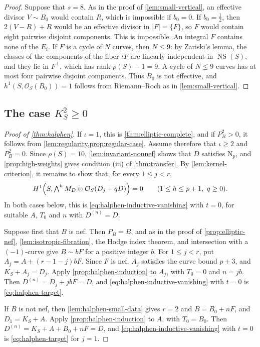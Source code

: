 \documentclass[11pt,reqno]{amsart}
\numberwithin{equation}{section}
\theoremstyle{remark}
\newcommand{\sshf}[1]{\mathcal{O}_{#1}}
\newcommand{\NP}{\mathrm N}
\begin{document}
\begin{proof}
Suppose that \(s=8\). As in the proof of \cref{lem:small-vertical}, an effective divisor \(V\sim B_0\) would contain \(R\), which is impossible if \(b_0=0\). If \(b_0=\tfrac12\), then \(2(V-R)+R\) would be an effective divisor in \(|F|=\{F\}\), so \(F\) would contain eight pairwise disjoint components. This is impossible. An integral \(F\) contains none of the \(E_i\). If \(F\) is a cycle of \(N\) curves, then \(N\leq9\): by Zariski's lemma, the classes of the components of the fiber \(\iota F\) are linearly independent in \(\operatorname{NS}(S)\), and they lie in \(F^\perp\), which has rank \(\rho(S)-1=9\). A cycle of \(N\leq9\) curves has at most four pairwise disjoint components. Thus \(B_0\) is not effective, and \(h^1(S,\sshf{S}(B_0))=1\) follows from Riemann--Roch as in \cref{lem:small-vertical}.
\end{proof}

\subsection{The case \texorpdfstring{\(K_S^2\geq0\)}{K\_S\^2 >= 0}}

\begin{proof}[Proof of \cref{thm:halphen}]
If \(\iota=1\), this is \cref{thm:elliptic-complete}, and if \(P_B^2>0\), it follows from \cref{lem:regularity,prop:regular-case}. Assume therefore that \(\iota\geq2\) and \(P_B^2=0\). Since \(\rho(S)=10\), \cref{lem:invariant-nonnef} shows that \(D\) satisfies \(\NP_p\), and \cref{prop:high-weights} gives condition \textup{(iii)} of \cref{thm:transfer}. By \cref{lem:kernel-criterion}, it remains to show that, for every \(1\leq j<r\),
\begin{equation}\label{eq:halphen-target}
 H^1\Bigl(S,\textstyle\bigwedge^hM_D\otimes\sshf{S}(D_j+qD)\Bigr)=0
 \qquad(1\leq h\leq p+1,\ q\geq0).
\end{equation}
In both cases below, this is \eqref{eq:halphen-inductive-vanishing} with \(t=0\), for suitable \(A\), \(T_0\) and \(n\) with \(D^{(n)}=D\).

Suppose first that \(B\) is nef. Then \(P_B=B\), and as in the proof of \cref{prop:elliptic-nef}, \cref{lem:isotropic-fibration}, the Hodge index theorem, and intersection with a \((-1)\)-curve give \(B\sim bF\) for a positive integer \(b\). For \(1\leq j<r\), put \(A_j=A+(r-1-j)bF\). Since \(F\) is nef, \(A_j\) satisfies the curve bound \(p+3\), and \(K_S+A_j=D_j\). Apply \cref{prop:halphen-induction} to \(A_j\), with \(T_0=0\) and \(n=jb\). Then \(D^{(n)}=D_j+jbF=D\), and \eqref{eq:halphen-inductive-vanishing} with \(t=0\) is \eqref{eq:halphen-target}.

If \(B\) is not nef, then \cref{lem:halphen-small-data} gives \(r=2\) and \(B=B_0+nF\), and \(D_1=K_S+A\). Apply \cref{prop:halphen-induction} to \(A\), with \(T_0=B_0\). Then \(D^{(n)}=K_S+A+B_0+nF=D\), and \eqref{eq:halphen-inductive-vanishing} with \(t=0\) is \eqref{eq:halphen-target} for \(j=1\).
\end{proof}
\end{document}
